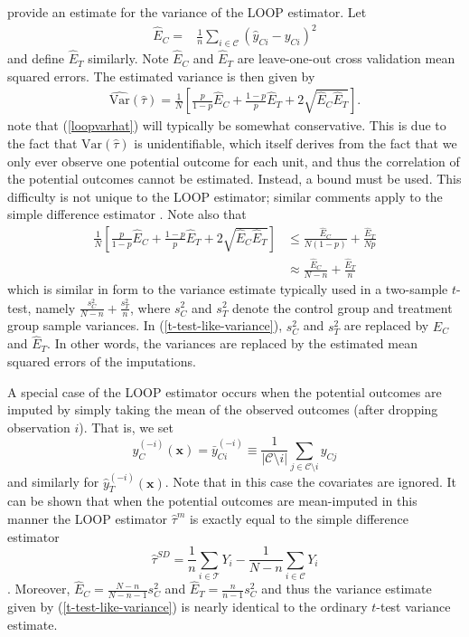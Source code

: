 \cite{loop} provide an estimate for the variance of the LOOP estimator.  Let
\begin{align}
\hat{E}_C = & \frac{1}{n}\sum_{i \in \mathcal{C}}(\hat{y}_{Ci} - y_{Ci})^2 \label{Echat}
\end{align}
and define $\hat{E}_T$ similarly.  Note $\hat{E}_C$ and $\hat{E}_T$ are leave-one-out cross validation mean squared errors.  The estimated variance is then given by
\begin{align}
\widehat{\mathrm{Var}}(\hat{\tau}) =  \frac{1}{N}\left[\frac{p}{1-p}\hat{E}_C + \frac{1-p}{p}\hat{E}_T + 2\sqrt{\hat{E}_C\hat{E}_T}\right]. \label{loopvarhat}
\end{align}
\cite{loop} note that (\ref{loopvarhat}) will typically be somewhat conservative.  This is due to the fact that $\mathrm{Var}(\hat{\tau})$ is unidentifiable, which itself derives from the fact that we only ever observe one potential outcome for each unit, and thus the correlation of the potential outcomes cannot be estimated.  Instead, a bound must be used.  This difficulty is not unique to the LOOP estimator; similar comments apply to the simple difference estimator \citep{aronow2014}.  Note also that
\begin{align}
\frac{1}{N}\left[\frac{p}{1-p}\hat{E}_C + \frac{1-p}{p}\hat{E}_T + 2\sqrt{\hat{E}_C\hat{E}_T}\right]
&\le
\frac{\hat{E}_C}{N(1-p)} + \frac{\hat{E}_T}{Np} \\
&\approx
\frac{\hat{E}_C}{N-n} + \frac{\hat{E}_T}{n} \label{t-test-like-variance}
\end{align}
which is similar in form to the variance estimate typically used in a two-sample $t$-test, namely $\frac{s^2_C}{N-n} + \frac{s^2_T}{n}$, where $s^2_C$ and $s^2_T$ denote the control group and treatment group sample variances.  In (\ref{t-test-like-variance}), $s^2_C$ and $s^2_T$ are replaced by $\hat{E}_C$ and $\hat{E}_T$.  In other words, the variances are replaced by the estimated mean squared errors of the imputations.

A special case of the LOOP estimator occurs when the potential outcomes are imputed by simply taking the mean of the observed  outcomes (after dropping observation $i$).  That is, we set
\begin{equation}
\hat{y}^{(-i)}_C(\mathbf{x}) = \bar{y}^{(-i)}_{Ci}\equiv \frac{1}{|{\mathcal{C}\setminus i}|}\sum_{j \in \mathcal{C} \setminus i} y_{Cj}
\end{equation}
and similarly for $\hat{y}^{(-i)}_T(\mathbf{x})$.  Note that in this case the covariates are ignored.  It can be shown that when the potential outcomes are mean-imputed in this manner the LOOP estimator $\hat{\tau}^{m}$ is exactly equal to the simple difference estimator
\begin{equation}
\hat{\tau}^{SD} = \frac{1}{n}\sum_{i \in \mathcal{T}}Y_i - \frac{1}{N-n}\sum_{i \in \mathcal{C}}Y_i
\end{equation}
\citep{loop}.  Moreover, $\hat{E}_C = \frac{N-n}{N-n-1}s^2_C$ and $\hat{E}_T = \frac{n}{n-1}s^2_C$ and thus the variance estimate given by (\ref{t-test-like-variance}) is nearly identical to the ordinary $t$-test variance estimate.


